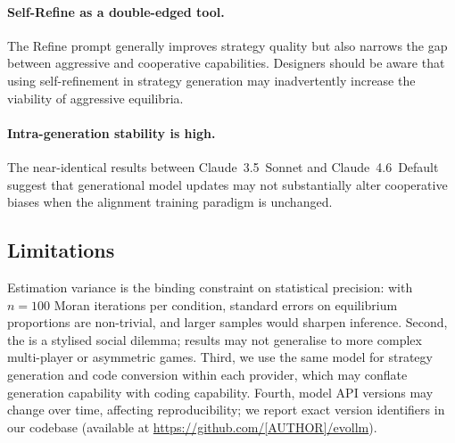 \paragraph{Self-Refine as a double-edged tool.}
The Refine prompt generally
improves strategy quality but also narrows the gap between aggressive and
cooperative capabilities. Designers should be aware that using self-refinement
in strategy generation may inadvertently increase the viability of aggressive
equilibria.

\paragraph{Intra-generation stability is high.}
The near-identical results
between Claude~3.5~Sonnet and Claude~4.6~Default suggest that generational
model updates may not substantially alter cooperative biases when the alignment
training paradigm is unchanged.

\subsection{Limitations}

Estimation variance is the binding constraint on statistical precision: with
$n=100$ Moran iterations per condition, standard errors on equilibrium proportions
are non-trivial, and larger samples would sharpen inference. Second, the \IPD is a stylised social dilemma; results may not
generalise to more complex multi-player or asymmetric games. Third, we use
the same model for strategy generation and code conversion within each provider,
which may conflate generation capability with coding capability. Fourth, model
API versions may change over time, affecting reproducibility; we report exact
version identifiers in our codebase (available at \url{https://github.com/[AUTHOR]/evollm}).
